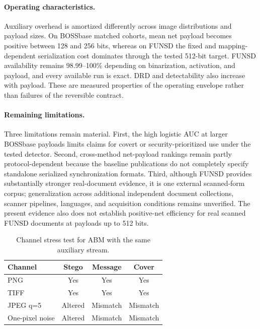 \paragraph{Operating characteristics.}
Auxiliary overhead is amortized differently across image distributions and
payload sizes. On BOSSbase matched cohorts, mean net payload becomes positive
between 128 and 256 bits, whereas on FUNSD the fixed and mapping-dependent
serialization cost dominates through the tested 512-bit target. FUNSD
availability remains 98.99--100\% depending on binarization, activation, and
payload, and every available run is exact. DRD and detectability also increase
with payload. These are measured properties of the operating envelope rather
than failures of the reversible contract.

\paragraph{Remaining limitations.}
Three limitations remain material. First, the high logistic AUC at larger
BOSSbase payloads limits claims for covert or security-prioritized use under the
tested detector. Second, cross-method net-payload rankings remain partly
protocol-dependent because the baseline publications do not completely specify
standalone serialized synchronization formats. Third, although FUNSD provides
substantially stronger real-document evidence, it is one external scanned-form
corpus; generalization across additional independent document collections,
scanner pipelines, languages, and acquisition conditions remains unverified.
The present evidence also does not establish positive-net efficiency for real
scanned FUNSD documents at payloads up to 512 bits.

\RevisionAddEnd

\begin{table}[t]
\centering
\caption{Channel stress test for ABM with the same auxiliary stream.}
\label{tab:channel-stress}
\begin{tabular}{@{}lccc@{}}
\toprule
\textbf{Channel} & \textbf{Stego} &
\textbf{Message} & \textbf{Cover} \\
\midrule
PNG & Yes & Yes & Yes \\
TIFF & Yes & Yes & Yes \\
JPEG q=5 & Altered & Mismatch & Mismatch \\
One-pixel noise & Altered & Mismatch & Mismatch \\
\bottomrule
\end{tabular}
\end{table}

